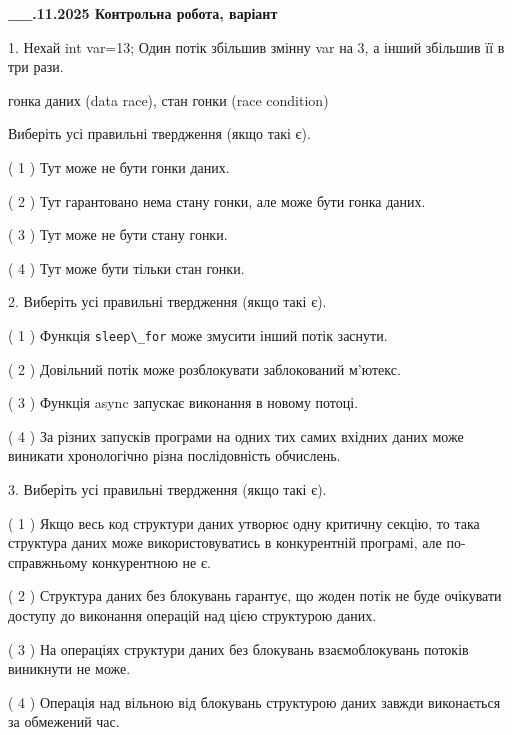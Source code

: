 \documentclass[12pt, ukrainian]{article}
\def\code#1{\Verb!#1!}
\begin{document}
\newpage
\begin {large}

\textbf{\_\_.11.2025 Контрольна робота, варіант  }\par


{
1. Нехай int var=13; Один потік збільшив змінну var на 3, а інший збільшив її в три рази.

гонка даних (data race), стан гонки (race condition)

Виберіть усі правильні твердження (якщо такі є).\par
\vspace{2mm}
( 1 ) Тут може не бути гонки даних.%

( 2 ) Тут гарантовано нема стану гонки, але може бути гонка даних.%

( 3 ) Тут може не бути стану гонки.%

( 4 ) Тут може бути тільки стан гонки.%


2. Виберіть усі правильні твердження (якщо такі є).\par
\vspace{2mm}

( 1 ) Функція \code{sleep\_for} може змусити інший потік заснути.%

( 2 ) Довільний потік може розблокувати заблокований м’ютекс.%

( 3 ) Функція async запускає виконання в новому потоці.%

( 4 ) За різних запусків програми на одних тих самих вхідних даних може виникати хронологічно різна послідовність обчислень.%


3. Виберіть усі правильні твердження (якщо такі є).\par
\vspace{2mm}

( 1 ) Якщо весь код структури даних утворює одну критичну секцію, то така структура даних може використовуватись в конкурентній програмі, але по-справжньо\-му конкурентною не є.%

( 2 ) Структура даних без блокувань гарантує, що жоден потік не буде очікувати доступу до виконання операцій над цією структурою даних.%

( 3 ) На операціях структури даних без блокувань взаємоблокувань потоків виникнути не може.%

( 4 ) Операція над вільною від блокувань структурою даних завжди виконається за обмежений час.%


}
\end{large}
\end{document}
